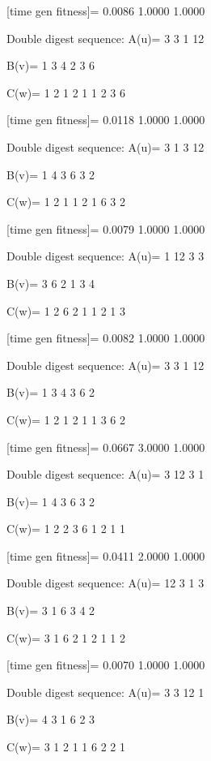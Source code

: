 [time gen fitness]=
    0.0086    1.0000    1.0000

Double digest sequence:
A(u)=
     3     3     1    12

B(v)=
     1     3     4     2     3     6

C(w)=
     1     2     1     2     1     1     2     3     6

[time gen fitness]=
    0.0118    1.0000    1.0000

Double digest sequence:
A(u)=
     3     1     3    12

B(v)=
     1     4     3     6     3     2

C(w)=
     1     2     1     1     2     1     6     3     2

[time gen fitness]=
    0.0079    1.0000    1.0000

Double digest sequence:
A(u)=
     1    12     3     3

B(v)=
     3     6     2     1     3     4

C(w)=
     1     2     6     2     1     1     2     1     3

[time gen fitness]=
    0.0082    1.0000    1.0000

Double digest sequence:
A(u)=
     3     3     1    12

B(v)=
     1     3     4     3     6     2

C(w)=
     1     2     1     2     1     1     3     6     2

[time gen fitness]=
    0.0667    3.0000    1.0000

Double digest sequence:
A(u)=
     3    12     3     1

B(v)=
     1     4     3     6     3     2

C(w)=
     1     2     2     3     6     1     2     1     1

[time gen fitness]=
    0.0411    2.0000    1.0000

Double digest sequence:
A(u)=
    12     3     1     3

B(v)=
     3     1     6     3     4     2

C(w)=
     3     1     6     2     1     2     1     1     2

[time gen fitness]=
    0.0070    1.0000    1.0000

Double digest sequence:
A(u)=
     3     3    12     1

B(v)=
     4     3     1     6     2     3

C(w)=
     3     1     2     1     1     6     2     2     1

